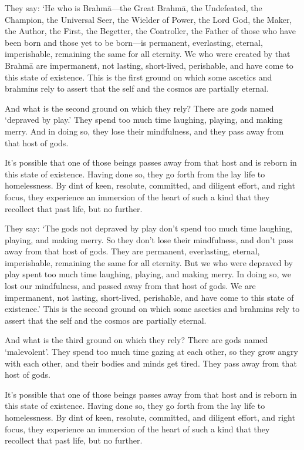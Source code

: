 \documentclass[12pt,openany]{book}%
\begin{document}
They say: ‘He who is \textsanskrit{Brahmā}—the Great \textsanskrit{Brahmā}, the Undefeated, the Champion, the Universal Seer, the Wielder of Power, the Lord God, the Maker, the Author, the First, the Begetter, the Controller, the Father of those who have been born and those yet to be born—is permanent, everlasting, eternal, imperishable, remaining the same for all eternity. We who were created by that \textsanskrit{Brahmā} are impermanent, not lasting, short-lived, perishable, and have come to this state of existence. This is the first ground on which some ascetics and brahmins rely to assert that the self and the cosmos are partially eternal. 

And what is the second ground on which they rely? There are gods named ‘depraved by play.’ They spend too much time laughing, playing, and making merry. And in doing so, they lose their mindfulness, and they pass away from that host of gods. 

It’s possible that one of those beings passes away from that host and is reborn in this state of existence. Having done so, they go forth from the lay life to homelessness. By dint of keen, resolute, committed, and diligent effort, and right focus, they experience an immersion of the heart of such a kind that they recollect that past life, but no further. 

They say: ‘The gods not depraved by play don’t spend too much time laughing, playing, and making merry. So they don’t lose their mindfulness, and don’t pass away from that host of gods. They are permanent, everlasting, eternal, imperishable, remaining the same for all eternity. But we who were depraved by play spent too much time laughing, playing, and making merry. In doing so, we lost our mindfulness, and passed away from that host of gods. We are impermanent, not lasting, short-lived, perishable, and have come to this state of existence.’ This is the second ground on which some ascetics and brahmins rely to assert that the self and the cosmos are partially eternal. 

And what is the third ground on which they rely? There are gods named ‘malevolent’. They spend too much time gazing at each other, so they grow angry with each other, and their bodies and minds get tired. They pass away from that host of gods. 

It’s possible that one of those beings passes away from that host and is reborn in this state of existence. Having done so, they go forth from the lay life to homelessness. By dint of keen, resolute, committed, and diligent effort, and right focus, they experience an immersion of the heart of such a kind that they recollect that past life, but no further. 
\end{document}
